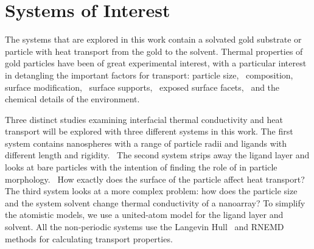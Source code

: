 \section{Systems of Interest}
The systems that are explored in this work contain a solvated gold substrate or particle with heat transport from the gold to the solvent. 
Thermal properties of gold particles have been of great experimental interest, with a particular interest in detangling the important factors for transport: particle size,~\cite{Zanjani2014,Liu2015,Wilhelmsen2015,Stocker2016,Tascini2016} composition,~\cite{Wilson:2002uq, Ong:2013rt} surface modification,~\cite{kuang:AuThl,Ong:2013rt,Ong:2014yq,Liu2015,Stocker2016,Hannah2015,Park2016,Leitner2017} surface supports,~\cite{Park2012} exposed surface facets,~\cite{Hannah2015} and the chemical details of the environment.~\cite{Ge2006,Park2012,Ong:2013rt,Ong:2014yq,Wilhelmsen2015,Park2016} 

Three distinct studies examining interfacial thermal conductivity and heat transport will be explored with three different systems in this work.
The first system contains nanospheres with a range of particle radii and ligands with different length and rigidity.~\cite{Stocker2016}
The second system strips away the ligand layer and looks at bare particles with the intention of finding the role of in particle morphology.~\cite{Neidhart}
How exactly does the surface of the particle affect heat transport?
The third system looks at a more complex problem: how does the particle size and the system solvent change thermal conductivity of a nanoarray?
To simplify the atomistic models, we use a united-atom model for the ligand layer and solvent.
All the non-periodic systems use the Langevin Hull~\cite{Vardeman2011} and RNEMD methods for calculating transport properties.~\cite{Stocker:2014qq}
